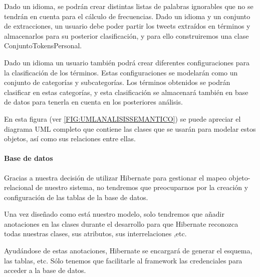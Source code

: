 Dado un idioma, se podrán crear distintas listas de palabras ignorables que no se tendrán en cuenta para el cálculo de frecuencias.
Dado un idioma y un conjunto de extracciones, un usuario debe poder partir los tweets extraídos en términos y almacenarlos para su posterior clasificación, y para ello construiremos una clase ConjuntoTokensPersonal.

Dado un idioma un usuario también podrá crear diferentes configuraciones para la clasificación de los términos. Estas configuraciones se modelarán como un conjunto de categorías y subcategorías.
Los términos obtenidos se podrán clasificar en estas categorías, y esta clasificación se almacenará también en base de datos para tenerla en cuenta en los posteriores análisis.

En esta figura (ver \ref{FIG:UMLANALISISSEMANTICO}) se puede apreciar el diagrama UML completo que contiene las clases que se usarán para modelar estos objetos, así como sus relaciones entre ellas.

\paragraph{Base de datos}
Gracias a nuestra decisión de utilizar Hibernate para gestionar el mapeo objeto-relacional de nuestro sistema, no tendremos que preocuparnos por la creación y configuración de las tablas de la base de datos.

Una vez diseñado como está nuestro modelo, solo tendremos que añadir anotaciones en las clases durante el desarrollo para que Hibernate reconozca todas nuestras clases, sus atributos, sus interrelaciones ,etc. 

Ayudándose de estas anotaciones, Hibernate se encargará de generar el esquema, las tablas, etc. Sólo tenemos que facilitarle al framework las credenciales para acceder a la base de datos.

